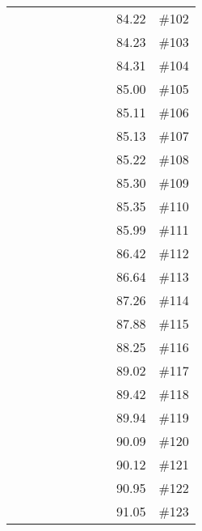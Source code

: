 \begin{longtable}{|c|c|c|c|c|c|c|c|c|c|}
 \x    & \x    & \x    &       &       & \x    &       & \x    & 84.22 & \#102 \\
 \x    & \x    & \x    & \x    &       & \x    &       & \x\m  & 84.23 & \#103 \\
 \x    & \x    & \x    &       &       & \x    &       &       & 84.31 & \#104 \\
 \x    & \x    & \x    & \x    &       & \x\m  & \x    &       & 85.00 & \#105 \\
 \x    & \x    &       & \x    & \x    &       &       &       & 85.11 & \#106 \\
 \x    & \x    & \x    & \x    &       & \x\m  &       &       & 85.13 & \#107 \\
 \x    & \x    & \x    & \x    &       & \x    & \x\m  &       & 85.22 & \#108 \\
 \x    & \x    &       & \x    & \x    &       & \x    &       & 85.30 & \#109 \\
 \x    & \x    & \x    &       &       & \x\m  & \x\m  &       & 85.35 & \#110 \\
 \x    & \x    & \x    &       &       & \x\m  &       & \x    & 85.99 & \#111 \\
 \x    & \x    &       &       &       & \x\m  &       & \x\m  & 86.42 & \#112 \\
 \x    & \x    & \x    &       &       &       &       & \x    & 86.64 & \#113 \\
 \x    & \x    & \x    & \x    &       &       & \x\m  &       & 87.26 & \#114 \\
 \x    & \x    &       &       &       &       & \x    &       & 87.88 & \#115 \\
 \x    & \x    &       & \x    & \x    & \x    & \x    &       & 88.25 & \#116 \\
 \x    & \x    & \x    &       &       &       &       &       & 89.02 & \#117 \\
 \x    & \x    &       &       &       & \x    & \x    &       & 89.42 & \#118 \\
 \x    & \x    & \x    & \x    &       & \x\m  &       & \x    & 89.94 & \#119 \\
 \x    & \x    &       &       & \x    &       & \x    &       & 90.09 & \#120 \\
 \x    & \x    & \x    &       &       & \x\m  & \x\m  &       & 90.12 & \#121 \\
 \x    & \x    &       & \x    &       &       &       &       & 90.95 & \#122 \\
 \x    & \x    &       &       &       &       &       & \x\m  & 91.05 & \#123 \\

\end{longtable}
